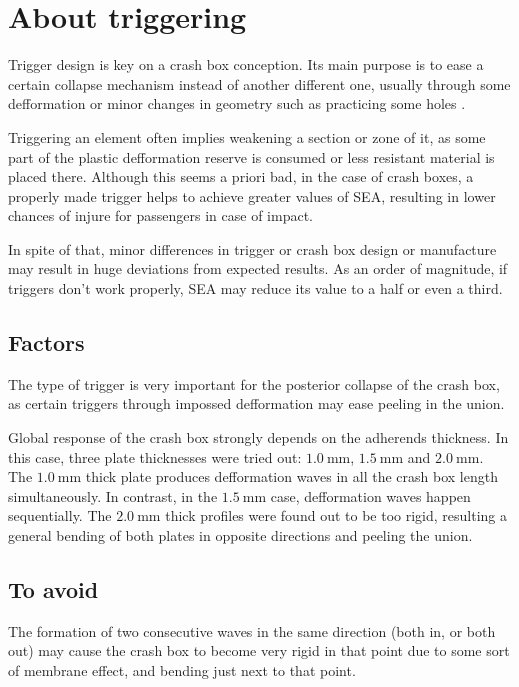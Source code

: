 \chapter{About triggering}
\label{ChapterTrigger}


Trigger design is key on a crash box conception. Its main purpose is to ease a certain collapse mechanism instead of another different one, usually through some defformation \citep{Abedrabbo2009, Scattina2011, Costas2013} or minor changes in geometry such as practicing some holes \citep{Peroni2009, Yamashita2013}.

Triggering an element often implies weakening a section or zone of it, as some part of the plastic defformation reserve is consumed or less resistant material is placed there. Although this seems a priori bad, in the case of crash boxes, a properly made trigger helps to achieve greater values of \gls{SEA}, resulting in lower chances of injure for passengers in case of impact.

In spite of that, minor differences in trigger or crash box design or manufacture may result in huge deviations from expected results. As an order of magnitude, if triggers don't work properly, \gls{SEA} may reduce its value to a half or even a third.

\section{Factors}%
The type of trigger is very important for the posterior collapse of the crash box, as certain triggers through impossed defformation may ease peeling in the union.

Global response of the crash box strongly depends on the adherends thickness. In this case, three plate thicknesses were tried out: $\SI{1.0}{\mm}$, $\SI{1.5}{\mm}$ and $\SI{2.0}{\mm}$. The $\SI{1.0}{\mm}$ thick plate produces defformation waves in all the crash box length simultaneously. In contrast, in the $\SI{1.5}{\mm}$ case, defformation waves happen sequentially. The $\SI{2.0}{\mm}$ thick profiles were found out to be too rigid, resulting a general bending of both plates in opposite directions and peeling the union.

\section{To avoid}%
The formation of two consecutive waves in the same direction (both in, or both out) may cause the crash box to become very rigid in that point due to some sort of membrane effect, and bending just next to that point.